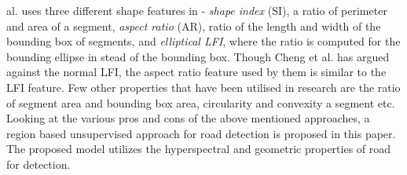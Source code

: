 \documentclass[12pt,twoside]{article}
\theoremstyle{plain}
\theoremstyle{definition}
\theoremstyle{remark}
\begin{document}
al. uses three different shape features in \cite{Cheng} - \textit{shape index} (SI), a ratio of perimeter and area of a segment, \textit{aspect ratio} (AR), ratio of the length and width of the bounding box of segments, and \textit{elliptical LFI}, where the ratio is computed for the bounding ellipse in stead of the bounding box. Though Cheng et al. has argued against the normal LFI, the aspect ratio feature used by them is similar to the LFI feature. Few other properties that have been utilised in research are the ratio of segment area and bounding box area, circularity and convexity a segment etc. Looking at the various pros and cons of the above mentioned approaches, a region based unsupervised approach for road detection is proposed in this paper. The proposed model utilizes the hyperspectral and geometric properties of road for detection.
\end{document}
